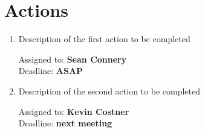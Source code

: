 \documentclass{cce2014-meetings}
\begin{document}
\section*{Actions}

\begin{enumerate}

   \item Description of the first action to be completed
         \begin{flushright}
            Assigned to: \textbf{Sean Connery} \\
            Deadline: \textbf{ASAP}
         \end{flushright}

   \item Description of the second action to be completed
         \begin{flushright}
            Assigned to: \textbf{Kevin Costner} \\
            Deadline: \textbf{next meeting}
         \end{flushright}


\end{enumerate}
\end{document}
